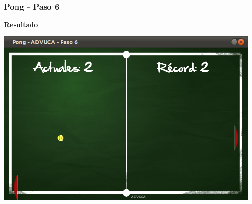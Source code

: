 \begin{frame}
	\frametitle{Pong - Paso 6}
	
    \begin{center}
        \textbf{Resultado}
    \end{center}
	
    \begin{center}
		\includegraphics[scale=0.4]{img/pong-advuca-6.png}
	\end{center}	

\end{frame}
